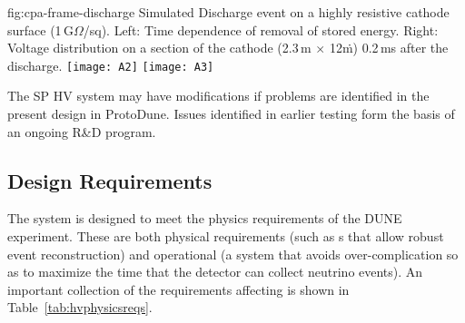 \begin{dunefigure}
{fig:cpa-frame-discharge}
{Simulated  Discharge event on a highly resistive cathode surface (1\,G$\Omega$/sq). Left: Time dependence of removal of stored energy. Right: Voltage distribution on a section of the cathode (2.3\,m $\times$ 12\.m) 0.2\,ms after the discharge.}
\texttt{[image: A2]}
\texttt{[image: A3]}
\end{dunefigure}

The SP HV system may have modifications if problems are identified in the present design in ProtoDune. Issues identified in earlier testing form the basis of an ongoing R\&D program.



\subsection{Design Requirements}
\label{sec:fdsp-hv-des-consid}
 
The %
 system is designed to meet the physics requirements of the DUNE experiment. These are both physical requirements (such as \efield{}s that allow robust event reconstruction) and operational (a system that avoids over-complication so as to maximize the time that the detector can collect neutrino events). An important collection of the requirements affecting  is shown in 
Table~\ref{tab:hvphysicsreqs}.

